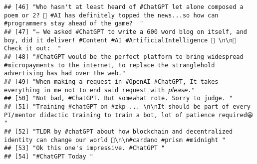 \documentclass[
]{article}
\begin{document}
\begin{verbatim}
## [46] "Who hasn't at least heard of #ChatGPT let alone composed a poem or 2? 🙋 #AI has definitely topped the news...so how can #programmers stay ahead of the game?  "                                                                                                                                               
## [47] "✏️ We asked #ChatGPT to write a 600 word blog on itself, and boy, did it deliver! #Content #AI #ArtificialIntelligence 📃 \n\n🤖 Check it out:  "                                                                                                                                                               
## [48] "#ChatGPT would be the perfect platform to bring widespread #micropayments to the internet, to replace the stranglehold advertising has had over the web."                                                                                                                                                      
## [49] "When making a request in #OpenAI #ChatGPT, It takes everything in me not to end said request with 𝘱𝘭𝘦𝘢𝘴𝘦."                                                                                                                                                                                                     
## [50] "Not bad, #ChatGPT. But somewhat rote. Sorry to judge. "                                                                                                                                                                                                                                                        
## [51] "Training #chatGPT on #zkp ... \n\nIt should be part of every PI/mentor didactic training to train a bot, lot of patience required😆 "                                                                                                                                                                          
## [52] "TLDR by #chatGPT about how blockchain and decentralized identity can change our world 🖖\n\n#cardano #prism #midnight "                                                                                                                                                                                        
## [53] "Ok this one's impressive. #ChatGPT "                                                                                                                                                                                                                                                                           
## [54] "#ChatGPT Today "                                                                                                                                                                                                                                                                                               

\end{verbatim}
\end{document}
